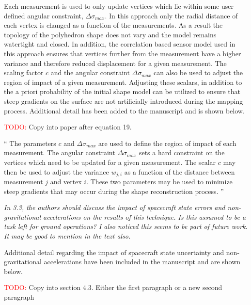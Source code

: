 \documentclass[11pt]{article}
\newcommand{\todo}{{\large \textcolor{red}{TODO: }}}
\newenvironment{correction}{\begin{list}{}{\setlength{\leftmargin}{1cm}\setlength{\rightmargin}{1cm}}\vspace{\parsep}\item[]``}{''\end{list}}
\newcommand{\comment}[1]{\item \itshape #1 \normalfont}
\begin{document}
\begin{itemize}
Each measurement is used to only update vertices which lie within some user defined angular constraint, \( \Delta \sigma_{max} \).
In this approach only the radial distance of each vertex is changed as a function of the measurements. 
As a result the topology of the polyhedron shape does not vary and the model remains watertight and closed.
In addition, the correlation based sensor model used in this approach ensures that vertices further from the measurement have a higher variance and therefore reduced displacement for a given measurement. 
The scaling factor \( c \) and the angular constraint \( \Delta \sigma_{max} \) can also be used to adjust the region of impact of a given measurement. 
Adjusting these scalars, in addition to the a priori probability of the initial shape model can be utilized to ensure that steep gradients on the surface are not artificially introduced during the mapping process.
Additional detail has been added to the manuscript and is shown below.

\todo Copy into paper after equation 19.

\begin{correction}
    The parameters \( c \) and \( \Delta \sigma_{max} \) are used to define the region of impact of each measurement. 
    The angular constraint \( \Delta \sigma_{max} \) sets a hard constraint on the vertices which need to be updated for a given measurement.
    The scalar \( c \) may then be used to adjust the variance \( w_{j,i} \) as a function of the distance between measurement \( j \) and vertex \( i \).
    These two parameters may be used to minimize steep gradients that may occur during the shape reconstruction process.
\end{correction}

\comment{
In 3.3, the authors should discuss the impact of spacecraft state errors and non-gravitational accelerations on the results of this technique. 
Is this assumed to be a task left for ground operations?
I also noticed this seems to be part of future work. It may be good to mention in the text also.
}

Additional detail regarding the impact of spacecraft state uncertainty and non-gravitational accelerations have been included in the manuscript and are shown below.

\todo Copy into section 4.3. Either the first paragraph or a new second paragraph


\end{itemize}
\end{document}
